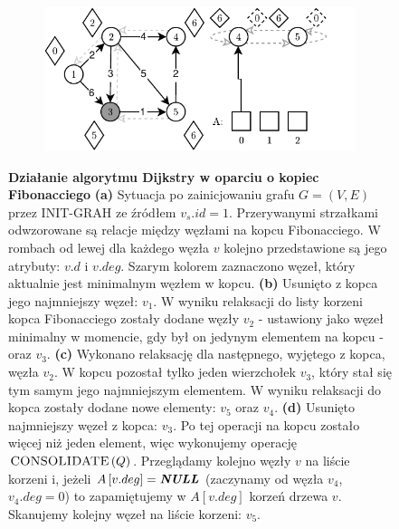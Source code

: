 \begin{figure}[!htbp]
\begin{subfigure}[b]{0.45\textwidth}
		\caption{}
	\end{subfigure}%
	\begin{subfigure}[b]{0.45\textwidth}
		\includegraphics[width=\textwidth]{Chapter_II/FIBONACCI-Example/d.pdf}
		\caption{}
	\end{subfigure}
	\caption{\textbf{Działanie algorytmu Dijkstry w oparciu o kopiec Fibonacciego} \textbf{(a)}  Sytuacja po zainicjowaniu grafu $G = \left( V, E \right)$ przez \textsf{INIT-GRAH} ze źródłem $v_{s}.id = 1$. Przerywanymi strzałkami odwzorowane są relacje między węzłami na kopcu Fibonacciego. W rombach od lewej dla każdego węzła $v$ kolejno przedstawione są jego atrybuty: $v.d$ i $v.deg$. Szarym kolorem zaznaczono węzeł, który aktualnie jest minimalnym węzłem w kopcu. \textbf{(b)} Usunięto z kopca jego najmniejszy węzeł: $v_{1}$. W wyniku relaksacji do listy korzeni kopca Fibonacciego zostały dodane węzły $v_{2}$ - ustawiony jako węzeł minimalny w momencie, gdy był on jedynym elementem na kopcu - oraz $v_{3}$. \textbf{(c)} Wykonano relaksację dla następnego, wyjętego z kopca, węzła $v_{2}$. W kopcu pozostał tylko jeden wierzchołek $v_{3}$, który stał się tym samym jego najmniejszym elementem. W wyniku relaksacji do kopca zostały dodane nowe elementy: $v_{5}$ oraz $v_{4}$. \textbf{(d)} Usunięto najmniejszy węzeł z kopca: $v_{3}$. Po tej operacji na kopcu zostało więcej niż jeden element, więc wykonujemy operację $\textrm{\textsc{CONSOLIDATE}} \left( Q \right)$. Przeglądamy kolejno węzły $v$ na liście korzeni i, jeżeli $A \left[ v.deg \right] = \emph{\textbf{NULL}} $ (zaczynamy od węzła $v_{4}$, $v_{4}.deg = 0$) to zapamiętujemy w $A \left[ v.deg \right]$ korzeń drzewa $v$. Skanujemy kolejny węzeł na liście korzeni: $v_{5}$. } \label{fig:exampleFibonacci1}
\end{figure}
\newpage


